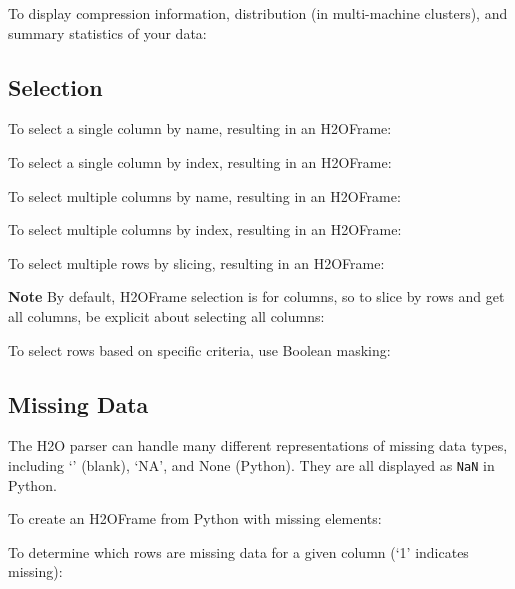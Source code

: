 {To display compression information, distribution (in multi-machine clusters), and summary statistics of your data:





\subsection{Selection}
To select a single column by name, resulting in an H2OFrame:


To select a single column by index, resulting in an H2OFrame:


\newpage
To select multiple columns by name, resulting in an H2OFrame:


To select multiple columns by index, resulting in an H2OFrame:


To select multiple rows by slicing, resulting in an H2OFrame: 

\textbf{Note} By default, H2OFrame selection is for columns, so to slice by rows
and get all columns, be explicit about selecting all columns:


To select rows based on specific criteria, use Boolean masking:



\subsection{Missing Data}
The H2O parser can handle many different representations of missing data types, including `' (blank),
`NA',  and None (Python).  They are all displayed as \texttt{NaN} in Python.

To create an H2OFrame from Python with missing elements:


To determine which rows are missing data for a given column (`1' indicates missing):


}
